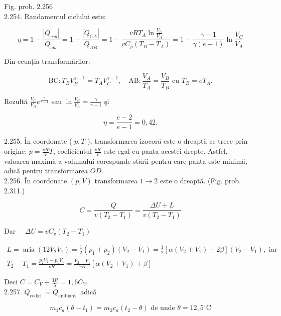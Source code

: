 \documentclass[10pt]{article}
\begin{document}
Fig. prob. 2.256\\
2.254. Randamentul ciclului este:

$$
\eta=1-\frac{\left|Q_{c e d}\right|}{Q_{a b s}}=1-\frac{\left|Q_{C A}\right|}{Q_{A B}}=1-\frac{v R T_{A} \ln \frac{V_{C}}{V_{A}}}{v C_{p}\left(T_{B}-T_{A}\right)}=1-\frac{\gamma-1}{\gamma(e-1)} \ln \frac{V_{C}}{V_{A}}
$$

Din ecuația transformărilor:

$$
\mathrm{BC}: T_{B} V_{B}^{\gamma-1}=T_{A} V_{C}^{\gamma-1}, \quad \mathrm{AB}: \frac{V_{A}}{T_{A}}=\frac{V_{B}}{T_{B}} \text { cu } T_{B}=e T_{A} .
$$

Rezultă $\frac{V_{C}}{V_{A}} e^{\frac{\gamma}{\gamma-1}}$ sau $\ln \frac{V_{C}}{V_{A}}=\frac{\gamma}{\gamma-1}$ şi

$$
\eta=\frac{e-2}{e-1}=0,42 .
$$

2.255. În coordonate ( $p, T$ ), transformarea izocoră este o dreaptă ce trece prin origine: $p=\frac{v R}{V} T$, coeficientul $\frac{v R}{V}$ este egal cu panta acestei drepte. Astfel,\\
valoarea maximă a volumului corespunde stării pentru care panta este minimă, adică pentru transformarea $O D$.\\
2.256. În coordonate $(p, V)$ transformarea $1 \rightarrow 2$ este o dreaptă. (Fig. prob. 2.311.)

$$
C=\frac{Q}{v\left(T_{2}-T_{1}\right)}=\frac{\Delta U+L}{v\left(T_{2}-T_{1}\right)}
$$

Dar $\quad \Delta U=v C_{v}\left(T_{2}-T_{1}\right)$

$$
\begin{gathered}
L=\operatorname{aria}\left(12 V_{2} V_{1}\right)=\frac{1}{2}\left(p_{1}+p_{2}\right)\left(V_{2}-V_{1}\right)=\frac{1}{2}\left[\alpha\left(V_{2}+V_{1}\right)+2 \beta\right]\left(V_{2}-V_{1}\right), \text { iar } \\
T_{2}-T_{1}=\frac{p_{2} V_{2}-p_{1} V_{1}}{v R}=\frac{V_{2}-V_{1}}{v R}\left[\alpha\left(V_{2}+V_{1}\right)+\beta\right]
\end{gathered}
$$

Deci $C=C_{V}+\frac{3 R}{5}=1,6 C_{V}$.\\
2.257. $Q_{\text {cedat }}=Q_{\text {ambiant }}$ adică

$$
m_{1} c_{a}\left(\theta-t_{1}\right)=m_{2} c_{a}\left(t_{2}-\theta\right) \text { de unde } \theta=12,5^{\circ} \mathrm{C}
$$
\end{document}
